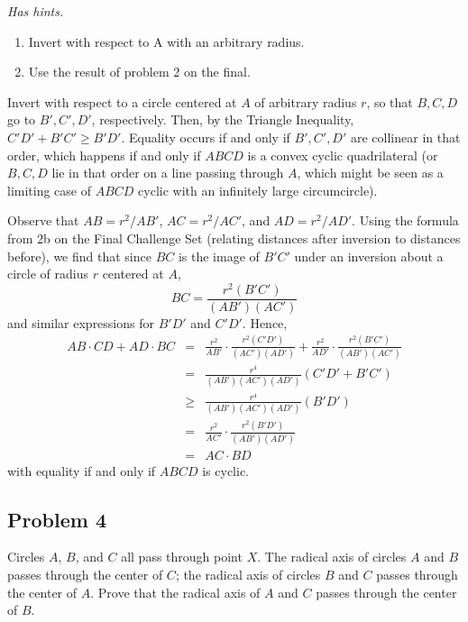\textit{Has hints.}
\begin{sketch}
    \begin{enumerate}
        \item Invert with respect to A with an arbitrary radius.
        \item Use the result of problem 2 on the final.
    \end{enumerate}
\end{sketch}

\begin{mdsoln}
Invert with respect to a circle centered at $A$ of arbitrary radius $r$, so that $B,C,D$ go to $B',C',D'$, respectively. Then, by the Triangle Inequality, $C'D'+B'C'\ge B'D'$. Equality occurs if and only if $B',C',D'$ are collinear in that order, which happens if and only if $ABCD$ is a convex cyclic quadrilateral (or $B,C,D$ lie in that order on a line passing through $A$, which might be seen as a limiting case of $ABCD$ cyclic with an infinitely large circumcircle).

Observe that $AB=r^2/AB'$, $AC=r^2/AC'$, and $AD=r^2/AD'$. Using the formula from 2b on the Final Challenge Set (relating distances after inversion to distances before), we find that since $BC$ is the image of $B'C'$ under an inversion about a circle of radius $r$ centered at $A$,$$BC=\frac{r^2(B'C')}{(AB')(AC')}$$and similar expressions for $B'D'$ and $C'D'$. Hence,\begin{eqnarray*}AB\cdot CD+AD\cdot BC&=&\frac{r^2}{AB'}\cdot \frac{r^2(C'D')}{(AC')(AD')}+\frac{r^2}{AD'}\cdot \frac{r^2(B'C')}{(AB')(AC')}\\ &=&\frac{r^4}{(AB')(AC')(AD')}(C'D'+B'C')\\ &\ge &\frac{r^4}{(AB')(AC')(AD')}(B'D')\\ &=&\frac{r^2}{AC'}\cdot \frac{r^2(B'D')}{(AB')(AD')}\\ &=&AC\cdot BD\end{eqnarray*}with equality if and only if $ABCD$ is cyclic.    
\end{mdsoln}

\subsection{Problem 4}
Circles $A$, $B$, and $C$ all pass through point $X$. The radical axis of circles $A$ and $B$ passes through the center of $C$; the radical axis of circles $B$ and $C$ passes through the center of $A$. Prove that the radical axis of $A$ and $C$ passes through the center of $B$.

